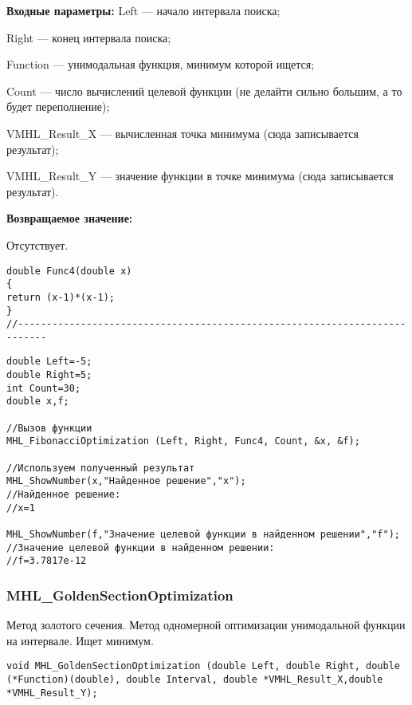 \documentclass[a4paper,12pt]{article}
\begin{document}
\textbf{Входные параметры:}
 Left --- начало интервала поиска;
 
Right --- конец интервала поиска;
 
Function --- унимодальная функция, минимум которой ищется;
 
Count --- число вычислений целевой функции (не делайти сильно большим, а то будет переполнение);
 
VMHL\_Result\_X --- вычисленная точка минимума (сюда записывается результат);
 
VMHL\_Result\_Y --- значение функции в точке минимума (сюда записывается результат).

\textbf{Возвращаемое значение:}
 
 Отсутствует.

\begin{lstlisting}[caption=Оптимизируемая функция]
double Func4(double x)
{
return (x-1)*(x-1);
}
//---------------------------------------------------------------------------
\end{lstlisting}


\begin{lstlisting}[label=code_use_MHL_FibonacciOptimization,caption=Пример использования]
double Left=-5;
double Right=5;
int Count=30;
double x,f;

//Вызов функции
MHL_FibonacciOptimization (Left, Right, Func4, Count, &x, &f);

//Используем полученный результат
MHL_ShowNumber(x,"Найденное решение","x");
//Найденное решение:
//x=1

MHL_ShowNumber(f,"Значение целевой функции в найденном решении","f");
//Значение целевой функции в найденном решении:
//f=3.7817e-12
\end{lstlisting}

\subsubsection{MHL\_GoldenSectionOptimization}\label{MHL_GoldenSectionOptimization}

Метод золотого сечения. Метод одномерной оптимизации унимодальной функции на интервале. Ищет минимум.


\begin{lstlisting}[label=code_syntax_MHL_GoldenSectionOptimization,caption=Синтаксис]
void MHL_GoldenSectionOptimization (double Left, double Right, double (*Function)(double), double Interval, double *VMHL_Result_X,double *VMHL_Result_Y);
\end{lstlisting}
\end{document}
